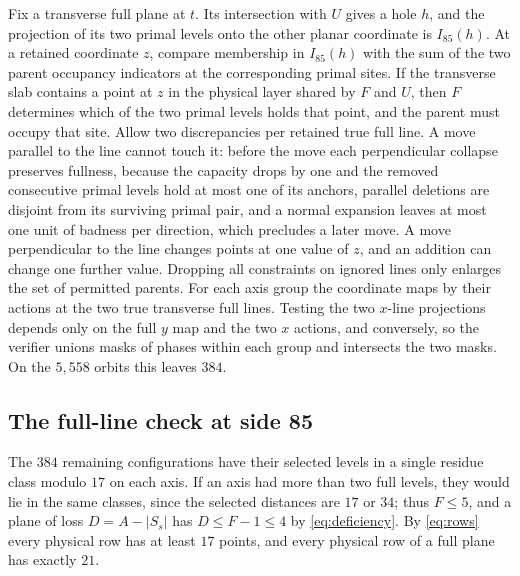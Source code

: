 \documentclass[11pt,colorlinks]{charlie}
\begin{document}
Fix a transverse full plane at $t$. Its intersection with $U$ gives a hole $h$, and the projection of its two primal levels onto the other planar coordinate is $I_{85}(h)$. At a retained coordinate $z$, compare membership in $I_{85}(h)$ with the sum of the two parent occupancy indicators at the corresponding primal sites. If the transverse slab contains a point at $z$ in the physical layer shared by $F$ and $U$, then $F$ determines which of the two primal levels holds that point, and the parent must occupy that site. Allow two discrepancies per retained true full line. A move parallel to the line cannot touch it: before the move each perpendicular collapse preserves fullness, because the capacity drops by one and the removed consecutive primal levels hold at most one of its anchors, parallel deletions are disjoint from its surviving primal pair, and a normal expansion leaves at most one unit of badness per direction, which precludes a later move. A move perpendicular to the line changes points at one value of $z$, and an addition can change one further value. Dropping all constraints on ignored lines only enlarges the set of permitted parents. For each axis group the coordinate maps by their actions at the two true transverse full lines. Testing the two $x$-line projections depends only on the full $y$ map and the two $x$ actions, and conversely, so the verifier unions masks of phases within each group and intersects the two masks. On the $5{,}558$ orbits this leaves $384$.

\subsection{The full-line check at side 85}\label{sec:fullline}
The $384$ remaining configurations have their selected levels in a single residue class modulo $17$ on each axis. If an axis had more than two full levels, they would lie in the same classes, since the selected distances are $17$ or $34$; thus $F\le5$, and a plane of loss $D=A-|S_s|$ has $D\le F-1\le4$ by \eqref{eq:deficiency}. By \eqref{eq:rows} every physical row has at least $17$ points, and every physical row of a full plane has exactly $21$.
\end{document}

